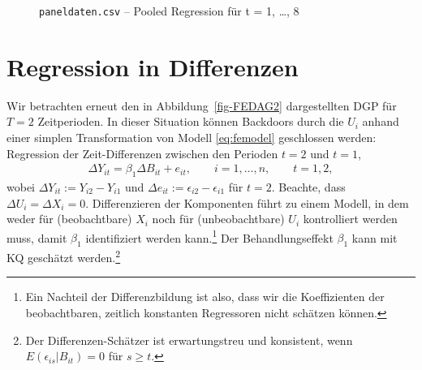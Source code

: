 \documentclass[
  a4paper,
  DIV=11,
  oneside]{scrreprt}
\begin{document}
\begin{figure}[t]


\caption{\label{fig-pooledregression2}\texttt{paneldaten.csv} -- Pooled
Regression für t = 1, \ldots, 8}

\end{figure}%

\section{Regression in Differenzen}\label{regression-in-differenzen}

Wir betrachten erneut den in Abbildung~\ref{fig-FEDAG2} dargestellten
DGP für \(T=2\) Zeitperioden. In dieser Situation können Backdoors durch
die \(U_i\) anhand einer simplen Transformation von Modell
\eqref{eq:femodel} geschlossen werden: Regression der Zeit-Differenzen
zwischen den Perioden \(t=2\) und \(t=1\), \begin{align}
  \Delta Y_{it} = \beta_1 \Delta B_{it} + e_{it}, \qquad i=1,\dots,n,\qquad t=1,2 \label{eq:femodeldiff},
\end{align} wobei \(\Delta Y_{it} := Y_{i2} - Y_{i1}\) und
\(\Delta e_{it} := \epsilon_{i2} - \epsilon_{i1}\) für \(t=2\). Beachte,
dass \(\Delta U_i=\Delta X_i=0\). Differenzieren der Komponenten führt
zu einem Modell, in dem weder für (beobachtbare) \(X_i\) noch für
(unbeobachtbare) \(U_i\) kontrolliert werden muss, damit \(\beta_1\)
identifiziert werden kann.\footnote{Ein Nachteil der Differenzbildung
  ist also, dass wir die Koeffizienten der beobachtbaren, zeitlich
  konstanten Regressoren nicht schätzen können.} Der Behandlungseffekt
\(\beta_1\) kann mit KQ geschätzt werden.\footnote{Der
  Differenzen-Schätzer ist erwartungstreu und konsistent, wenn
  \(E(\epsilon_{is}\vert B_{it})=0\) für \(s\geq t\).}
\end{document}
